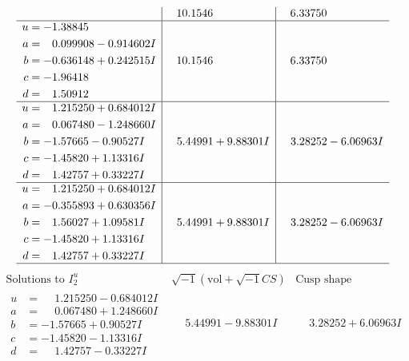 \documentclass[1p]{elsarticle_modified}
\theoremstyle{definition}
\newcommand{\I}{\sqrt{-1}}
\begin{document}
$$\begin{array}{c|c|c}
 & \phantom{-}10.1546\phantom{ +0.000000I} & \phantom{-}6.33750\phantom{ +0.000000I} \\ \hline\begin{aligned}
u &= -1.38845\phantom{ +0.000000I} \\
a &= \phantom{-}0.099908 - 0.914602 I \\
b &= -0.636148 + 0.242515 I \\
c &= -1.96418\phantom{ +0.000000I} \\
d &= \phantom{-}1.50912\phantom{ +0.000000I}\end{aligned}
 & \phantom{-}10.1546\phantom{ +0.000000I} & \phantom{-}6.33750\phantom{ +0.000000I} \\ \hline\begin{aligned}
u &= \phantom{-}1.215250 + 0.684012 I \\
a &= \phantom{-}0.067480 - 1.248660 I \\
b &= -1.57665 - 0.90527 I \\
c &= -1.45820 + 1.13316 I \\
d &= \phantom{-}1.42757 + 0.33227 I\end{aligned}
 & \phantom{-}5.44991 + 9.88301 I & \phantom{-}3.28252 - 6.06963 I \\ \hline\begin{aligned}
u &= \phantom{-}1.215250 + 0.684012 I \\
a &= -0.355893 + 0.630356 I \\
b &= \phantom{-}1.56027 + 1.09581 I \\
c &= -1.45820 + 1.13316 I \\
d &= \phantom{-}1.42757 + 0.33227 I\end{aligned}
 & \phantom{-}5.44991 + 9.88301 I & \phantom{-}3.28252 - 6.06963 I\\
 \hline 
 \end{array}$$\newpage$$\begin{array}{c|c|c}  
\text{Solutions to }I^u_{2}& \I (\text{vol} + \sqrt{-1}CS) & \text{Cusp shape}\\
 \hline 
\begin{aligned}
u &= \phantom{-}1.215250 - 0.684012 I \\
a &= \phantom{-}0.067480 + 1.248660 I \\
b &= -1.57665 + 0.90527 I \\
c &= -1.45820 - 1.13316 I \\
d &= \phantom{-}1.42757 - 0.33227 I\end{aligned}
 & \phantom{-}5.44991 - 9.88301 I & \phantom{-}3.28252 + 6.06963 I \\ \hline\begin{aligned}

\end{aligned}
\end{array}$$
\end{document}
